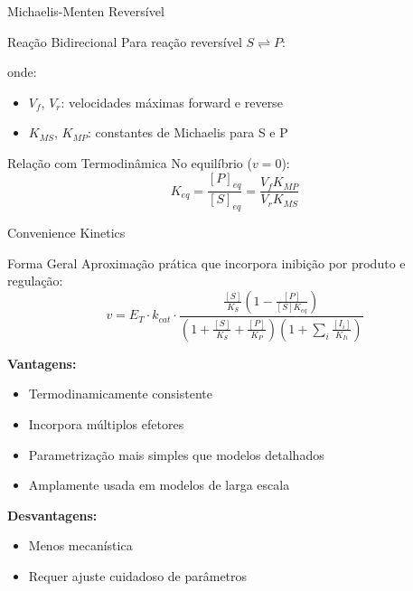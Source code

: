 \begin{frame}{Michaelis-Menten Reversível}
\begin{block}{Reação Bidirecional}
Para reação reversível $S \rightleftharpoons P$:

onde:
\begin{itemize}
    \item $V_f$, $V_r$: velocidades máximas forward e reverse
    \item $K_{MS}$, $K_{MP}$: constantes de Michaelis para S e P
\end{itemize}
\end{block}

\begin{exampleblock}{Relação com Termodinâmica}
No equilíbrio ($v = 0$):
\begin{equation*}
K_{eq} = \frac{[P]_{eq}}{[S]_{eq}} = \frac{V_f K_{MP}}{V_r K_{MS}}
\end{equation*}
\end{exampleblock}
\end{frame}

\begin{frame}{Convenience Kinetics}
\begin{block}{Forma Geral}
Aproximação prática que incorpora inibição por produto e regulação:
\begin{equation*}
v = E_T \cdot k_{cat} \cdot \frac{\frac{[S]}{K_S}\left(1 - \frac{[P]}{[S]K_{eq}}\right)}{\left(1 + \frac{[S]}{K_S} + \frac{[P]}{K_P}\right)\left(1 + \sum_i \frac{[I_i]}{K_{Ii}}\right)}
\end{equation*}
\end{block}

\textbf{Vantagens:}
\begin{itemize}
    \item Termodinamicamente consistente
    \item Incorpora múltiplos efetores
    \item Parametrização mais simples que modelos detalhados
    \item Amplamente usada em modelos de larga escala
\end{itemize}

\textbf{Desvantagens:}
\begin{itemize}
    \item Menos mecanística
    \item Requer ajuste cuidadoso de parâmetros
\end{itemize}
\end{frame}

